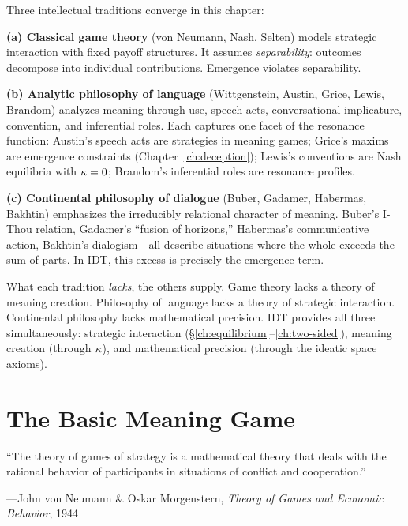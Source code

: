 \begin{interpretation}
Three intellectual traditions converge in this chapter:

\textbf{(a) Classical game theory} (von Neumann, Nash, Selten) models
strategic interaction with fixed payoff structures. It assumes
\emph{separability}: outcomes decompose into individual contributions.
Emergence violates separability.

\textbf{(b) Analytic philosophy of language} (Wittgenstein, Austin, Grice,
Lewis, Brandom) analyzes meaning through use, speech acts, conversational
implicature, convention, and inferential roles. Each captures one facet of
the resonance function: Austin's speech acts are strategies in meaning
games; Grice's maxims are emergence constraints (Chapter~\ref{ch:deception});
Lewis's conventions are Nash equilibria with $\kappa = 0$; Brandom's
inferential roles are resonance profiles.

\textbf{(c) Continental philosophy of dialogue} (Buber, Gadamer, Habermas,
Bakhtin) emphasizes the irreducibly relational character of meaning. Buber's
I-Thou relation, Gadamer's ``fusion of horizons,'' Habermas's communicative
action, Bakhtin's dialogism---all describe situations where the whole
exceeds the sum of parts. In IDT, this excess is precisely the emergence
term.

What each tradition \emph{lacks}, the others supply. Game theory lacks a
theory of meaning creation. Philosophy of language lacks a theory of
strategic interaction. Continental philosophy lacks mathematical precision.
IDT provides all three simultaneously: strategic interaction
(\S\ref{ch:equilibrium}--\ref{ch:two-sided}), meaning creation (through
$\kappa$), and mathematical precision (through the ideatic space axioms).
\end{interpretation}



\chapter{The Basic Meaning Game}
\label{ch:basic-game}

\epigraph{``The theory of games of strategy is a mathematical theory that
deals with the rational behavior of participants in situations of conflict
and cooperation.''}
{---John von Neumann \& Oskar Morgenstern, \emph{Theory of Games and
Economic Behavior}, 1944}



